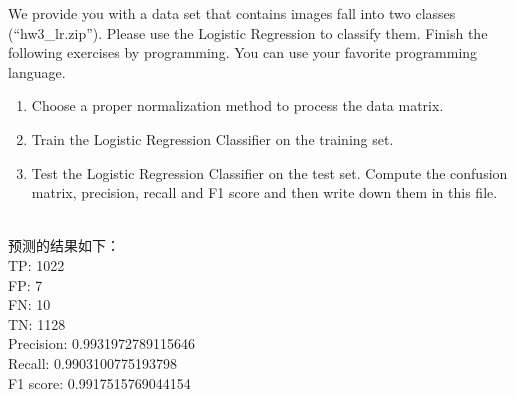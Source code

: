 \documentclass[11pt,letter,notitlepage]{article}
\begin{document}
\newpage
\begin{exercise}
We provide you with a data set that contains images fall into two classes (``hw3\_lr.zip''). Please use the Logistic Regression to classify them.
Finish the following exercises by programming. You can use your favorite programming language.
\begin{enumerate}
\item Choose a proper normalization method to process the data matrix.
\item Train the Logistic Regression Classifier on the training set.
\item Test the Logistic Regression Classifier on the test set. Compute the confusion matrix, precision, recall and F1 score and then write down them in this file.
\end{enumerate}
\end{exercise}

\begin{solution}
	\heiti
	\ \\
	预测的结果如下：\\
	TP: 1022\\
	FP: 7\\
	FN: 10\\
	TN: 1128\\
	Precision: 0.9931972789115646\\
	Recall: 0.9903100775193798\\
	F1 score: 0.9917515769044154\\
	

\end{solution}





\end{document}
